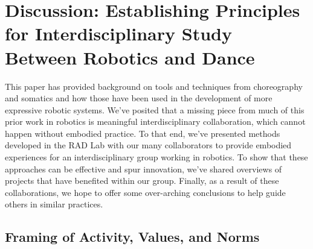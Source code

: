 \documentclass[arts,article,submit,moreauthors,pdftex,10pt,a4paper]{mdpi}
\begin{document}
\section{Discussion: Establishing Principles for Interdisciplinary Study Between Robotics and Dance}
This paper has provided background on tools and techniques from choreography and somatics and how those have been used in the development of more expressive robotic systems.  We've posited that a missing piece from much of this prior work in robotics is meaningful interdisciplinary collaboration, which cannot happen without embodied practice.  To that end, we've presented methods developed in the RAD Lab with our many collaborators to provide embodied experiences for an interdisciplinary group working in robotics.  To show that these approaches can be effective and spur innovation, we've shared overviews of projects that have benefited within our group.  Finally, as a result of these collaborations, we hope to offer some over-arching conclusions to help guide others in similar practices.  

\subsection{Framing of Activity, Values, and Norms}

        
\end{document}
